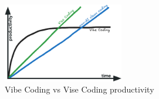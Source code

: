 \documentclass[twocolumn,german]{article}
\begin{document}
\begin{figure}[hbt!]
  \begin{center}
  \vspace{-2mm}
  \includegraphics[width=0.47\textwidth]{figures/vibe_vise_non_ai_v2}
  \vspace{-5mm}
\caption{Vibe Coding vs Vise Coding productivity}
\label{fig:vibevise}
\end{center}
\end{figure}

\newpage 


\end{document}
